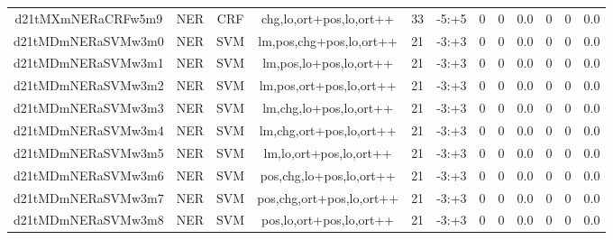 \documentclass[a4paper]{article}
\begin{document}
\begin{landscape}
\begin{center}
\begin{tabular}{ |c|c|c|c|c|c|c|c|c|c|c|c|}
 
 	
 	\small{ d21tMXmNERaCRFw5m9 } & \small{ NER} & \small{  CRF }  & chg,lo,ort+pos,lo,ort++  &  33 &  \small{  -5:+5 }  &  0 & 0 & 0.0  &  0 & 0 & 0.0 \\
 	

 
 	
 	\small{ d21tMDmNERaSVMw3m0 } & \small{ NER} & \small{  SVM }  & lm,pos,chg+pos,lo,ort++  &  21 &  \small{  -3:+3 }  &  0 & 0 & 0.0  &  0 & 0 & 0.0 \\
 	

 
 	
 	\small{ d21tMDmNERaSVMw3m1 } & \small{ NER} & \small{  SVM }  & lm,pos,lo+pos,lo,ort++  &  21 &  \small{  -3:+3 }  &  0 & 0 & 0.0  &  0 & 0 & 0.0 \\
 	

 
 	
 	\small{ d21tMDmNERaSVMw3m2 } & \small{ NER} & \small{  SVM }  & lm,pos,ort+pos,lo,ort++  &  21 &  \small{  -3:+3 }  &  0 & 0 & 0.0  &  0 & 0 & 0.0 \\
 	

 
 	
 	\small{ d21tMDmNERaSVMw3m3 } & \small{ NER} & \small{  SVM }  & lm,chg,lo+pos,lo,ort++  &  21 &  \small{  -3:+3 }  &  0 & 0 & 0.0  &  0 & 0 & 0.0 \\
 	

 
 	
 	\small{ d21tMDmNERaSVMw3m4 } & \small{ NER} & \small{  SVM }  & lm,chg,ort+pos,lo,ort++  &  21 &  \small{  -3:+3 }  &  0 & 0 & 0.0  &  0 & 0 & 0.0 \\
 	

 
 	
 	\small{ d21tMDmNERaSVMw3m5 } & \small{ NER} & \small{  SVM }  & lm,lo,ort+pos,lo,ort++  &  21 &  \small{  -3:+3 }  &  0 & 0 & 0.0  &  0 & 0 & 0.0 \\
 	

 
 	
 	\small{ d21tMDmNERaSVMw3m6 } & \small{ NER} & \small{  SVM }  & pos,chg,lo+pos,lo,ort++  &  21 &  \small{  -3:+3 }  &  0 & 0 & 0.0  &  0 & 0 & 0.0 \\
 	

 
 	
 	\small{ d21tMDmNERaSVMw3m7 } & \small{ NER} & \small{  SVM }  & pos,chg,ort+pos,lo,ort++  &  21 &  \small{  -3:+3 }  &  0 & 0 & 0.0  &  0 & 0 & 0.0 \\
 	

 
 	
 	\small{ d21tMDmNERaSVMw3m8 } & \small{ NER} & \small{  SVM }  & pos,lo,ort+pos,lo,ort++  &  21 &  \small{  -3:+3 }  &  0 & 0 & 0.0  &  0 & 0 & 0.0 \\
 	


\end{tabular}
\end{center}
\end{landscape}
\end{document}
